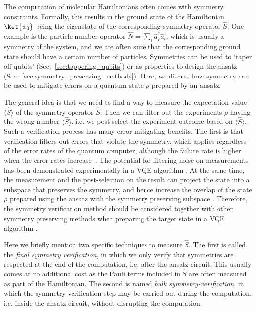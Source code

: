 The computation of molecular Hamiltonians often comes with symmetry constraints. Formally, this results in the ground state of the Hamiltonian $\ket{\psi_0}$ being the eigenstate of the corresponding symmetry operator $\hat{S}$. One example is the particle number operator $\hat{N} = \sum_i \hat{a}^{\dagger}_i \hat{a}_i$, which is usually a symmetry of the system, and we are often sure that the corresponding ground state should have a certain number of particles. Symmetries can be used to `taper off qubits' (Sec.~\ref{sec:tappering_qubits}) or as properties to design the ansatz (Sec.~\ref{sec:symmetry_preserving_methods}). Here, we discuss how symmetry can be used to mitigate errors on a quantum state $\rho$ prepared by an ansatz.

The general idea is that we need to find a way to measure the expectation value $\langle \hat{S} \rangle$ of the symmetry operator $\hat{S}$. Then we can filter out the experiments $\rho$ having the wrong number $\langle \hat{S} \rangle$, i.e. we post-select the experiment outcome based on $\langle \hat{S} \rangle$. Such a verification process has many error-mitigating benefits. The first is that verification filters out errors that violate the symmetry, which applies regardless of the error rates of the quantum computer, although the failure rate is higher when the error rates increase~\cite{mcardleErrorMitigatedDigitalQuantum2019}. The potential for filtering noise on measurements has been demonstrated experimentally in a VQE algorithm \cite{Sagastizabal2019}. At the same time, the measurement and the post-selection on the result can project the state into a subspace that preserves the symmetry, and hence increase the overlap of the state $\rho$ prepared using the ansatz with the symmetry preserving subspace \cite{bonet-monroigLowcostErrorMitigation2018}. Therefore, the symmetry verification method should be considered together with other symmetry preserving methods when preparing the target state in a VQE algorithm \cite{Sagastizabal2019}.

Here we briefly mention two specific techniques to measure $\hat{S}$.
The first is called the \textit{final symmetry verification},
in which we only verify that symmetries are respected at the end of the computation, i.e. after the ansatz circuit. This usually comes at no additional cost as the Pauli terms included in $\hat{S}$ are often measured as part of the Hamiltonian.
The second is named \textit{bulk symmetry-verification}, in which the symmetry verification step may be carried
out during the computation, i.e. inside the ansatz circuit, without disrupting the computation.

